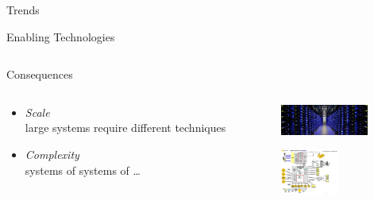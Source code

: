 \documentclass{beamer}
\begin{document}
\begin{frame}{Trends}
\begin{block}{Enabling Technologies}
\begin{columns}
\begin{column}{.5\textwidth}

    \end{column}
  \end{columns}
  \end{block}

  \begin{block}{Consequences}

  \begin{columns}
    \begin{column}{.5\textwidth}
      \begin{itemize}
      \item \emph{Scale} \\ large systems require different techniques

      \item \emph{Complexity} \\ systems of systems of \ldots

      \end{itemize}

    \end{column}
    \begin{column}{.5\textwidth}
      \centering

      \includegraphics[height=1cm]{servers.jpg}

      \vspace*{12pt}

      \includegraphics[height=1.5cm]{system.jpg}


    \end{column}
  \end{columns}

  \end{block}
\end{frame}
\end{document}
